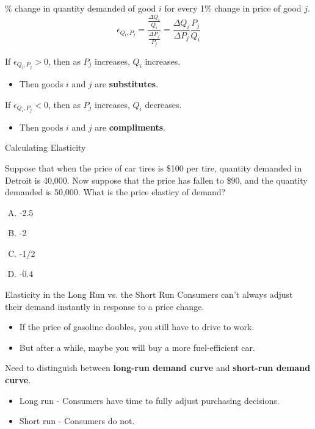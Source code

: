 \documentclass[12pt,t]{beamer}
\begin{document}
\begin{frame}
  
  \bigskip
  \% change in quantity demanded of good $i$ for every 1\% change in price of good $j$.
  $$
    \epsilon_{Q_i,P_j}= \frac{\frac{\Delta Q_i}{Q_i}}{\frac{\Delta P_j}{P_j}}=\frac{\Delta Q_i}{\Delta P_j}\frac{P_j}{Q_i}
  $$
  
  \pause\bigskip
  If $\epsilon_{Q_i,P_j}>0$, then as $P_j$ increases, $Q_i$ increases.
  \begin{itemize}
    \item Then goods $i$ and $j$ are \textbf{substitutes}.
  \end{itemize}
  
  \pause\bigskip
  If $\epsilon_{Q_i,P_j}<0$, then as $P_j$ increases, $Q_i$ decreases.
  \begin{itemize}
    \item Then goods $i$ and $j$ are \textbf{compliments}.
  \end{itemize}
\end{frame}

\begin{frame}{Calculating Elasticity}

\bigskip
Suppose that when the price of car tires is \$100 per tire, quantity demanded in Detroit is 40,000. Now suppose that the price has fallen to \$90, and the quantity demanded is 50,000. What is the price elasticy of demand?

  \bigskip
  \begin{enumerate}[A)]
    \item  -2.5
    \item  -2
    \item  -1/2
    \item  -0.4
  \end{enumerate}
\end{frame}

\begin{frame}{Elasticity in the Long Run vs. the Short Run}
  Consumers can't always adjust their demand instantly in response to a price change.
  \begin{itemize}
    \item If the price of gasoline doubles, you still have to drive to work.

    \item But after a while, maybe you will buy a more fuel-efficient car.
  \end{itemize}

  \pause\bigskip
  Need to distinguish between \textbf{long-run demand curve} and \textbf{short-run demand curve}.
  \begin{itemize}
    \item Long run - Consumers have time to fully adjust purchasing decisions.

    \item Short run - Consumers do not.
  \end{itemize}
\end{frame}
\end{document}
